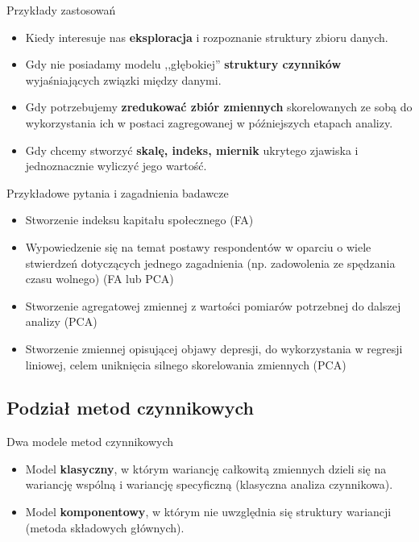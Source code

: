 \documentclass{beamer}
\begin{document}
\begin{frame}{Przykłady zastosowań}
  \begin{itemize}
  \item Kiedy interesuje nas \textbf{eksploracja} i rozpoznanie struktury zbioru danych.
  \item Gdy nie posiadamy modelu ,,głębokiej'' \textbf{struktury czynników} wyjaśniających związki między danymi.
  \item Gdy potrzebujemy \textbf{zredukować zbiór zmiennych} skorelowanych ze sobą do wykorzystania ich w postaci zagregowanej w późniejszych etapach analizy.
  \item Gdy chcemy stworzyć \textbf{skalę, indeks, miernik} ukrytego zjawiska i jednoznacznie wyliczyć jego wartość. 
  \end{itemize}
\end{frame}

\begin{frame}{Przykładowe pytania i zagadnienia badawcze}
  \begin{itemize}
  \item Stworzenie indeksu kapitału społecznego (FA)
  \item Wypowiedzenie się na temat postawy respondentów w oparciu o wiele stwierdzeń dotyczących jednego zagadnienia (np. zadowolenia ze spędzania czasu wolnego) (FA lub PCA)
  \item Stworzenie agregatowej zmiennej z wartości pomiarów potrzebnej do dalszej analizy (PCA)
  \item Stworzenie zmiennej opisującej objawy depresji, do wykorzystania w regresji liniowej, celem uniknięcia silnego skorelowania zmiennych (PCA)
  \end{itemize}
\end{frame}

\subsection{Podział metod czynnikowych}
\begin{frame}{Dwa modele metod czynnikowych}
  \begin{itemize}
  \item Model \textbf{klasyczny}, w którym wariancję całkowitą zmiennych dzieli się na wariancję wspólną i wariancję specyficzną (klasyczna analiza czynnikowa).
  \item Model \textbf{komponentowy}, w którym nie uwzględnia się struktury wariancji (metoda składowych głównych).
  \end{itemize}
\end{frame}
\end{document}
